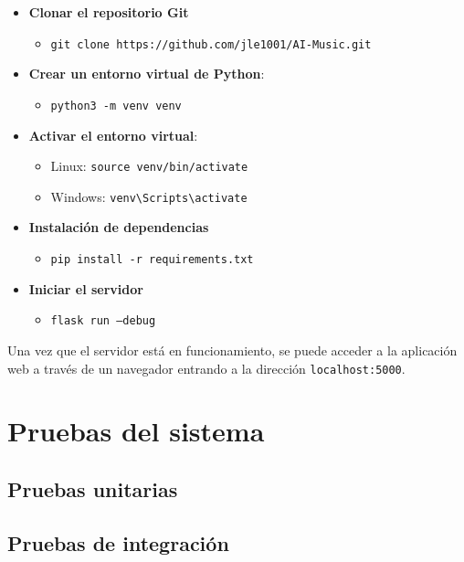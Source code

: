 \begin{itemize}
\tightlist

\item \textbf{Clonar el repositorio Git}
	\begin{itemize}
	\tightlist
		\item \texttt{git clone https://github.com/jle1001/AI-Music.git}
	\end{itemize}

\item \textbf{Crear un entorno virtual de Python}: 
	\begin{itemize}
	\tightlist
		\item \texttt{python3 -m venv venv}
	\end{itemize}

\item \textbf{Activar el entorno virtual}: 
	\begin{itemize}
		\item Linux: \texttt{source venv/bin/activate}
		
		\item Windows: \texttt{venv\textbackslash Scripts\textbackslash activate}
	\end{itemize}

\item \textbf{Instalación de dependencias}
	\begin{itemize}
	\tightlist
		\item \texttt{pip install -r requirements.txt}
	\end{itemize}

\item \textbf{Iniciar el servidor}
	\begin{itemize}
	\tightlist
		\item \texttt{flask run --debug}
	\end{itemize}
\end{itemize}

Una vez que el servidor está en funcionamiento, se puede acceder a la aplicación web a través de un navegador entrando a la dirección \texttt{localhost:5000}.

\section{Pruebas del sistema}

\subsection{Pruebas unitarias}

\subsection{Pruebas de integración}